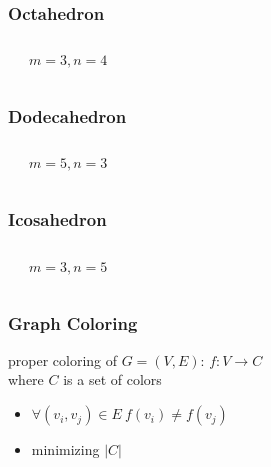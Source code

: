 \documentclass[dvipsnames]{beamer}
\begin{document}
\begin{frame}
  \frametitle{Octahedron}

  \begin{columns}
    \begin{center}
    \end{center}

    \begin{center}

      $m=3, n=4$
    \end{center}
  \end{columns}
\end{frame}

\begin{frame}
  \frametitle{Dodecahedron}

  \begin{columns}
    \begin{center}
    \end{center}

    \begin{center}

      $m=5, n=3$
    \end{center}
  \end{columns}
\end{frame}

\begin{frame}
  \frametitle{Icosahedron}

  \begin{columns}
    \begin{center}
    \end{center}

    $m=3, n=5$
  \end{columns}
\end{frame}

\begin{frame}
  \frametitle{Graph Coloring}

  \begin{definition}
    \alert{proper coloring} of $G=(V,E)$: $f: V \rightarrow C$\\
      where $C$ is a set of colors
    \begin{itemize}
      \item $\forall (v_i,v_j) \in E~f(v_i) \neq f(v_j)$
      \item minimizing $|C|$
    \end{itemize}
  \end{definition}
\end{frame}
\end{document}
